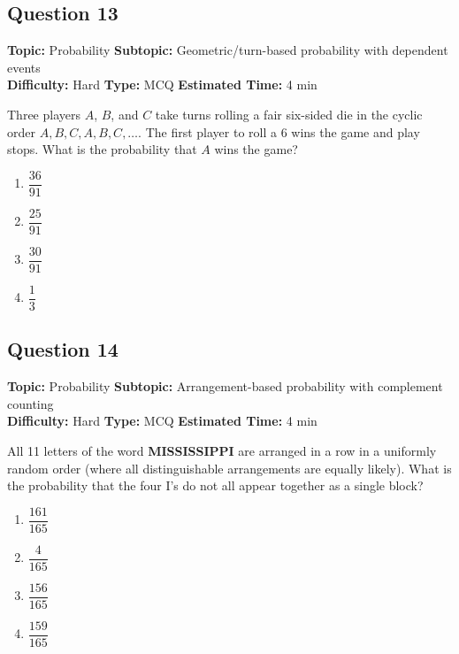 \documentclass[11pt,a4paper]{article}
\begin{document}
\subsection*{Question 13}
\textbf{Topic:} Probability \quad
\textbf{Subtopic:} Geometric/turn-based probability with dependent events \\
\textbf{Difficulty:} Hard \quad
\textbf{Type:} MCQ \quad
\textbf{Estimated Time:} 4 min
\begin{tcolorbox}[qbox]
Three players \(A\), \(B\), and \(C\) take turns rolling a fair six-sided die in the cyclic order \(A, B, C, A, B, C, \ldots\). The first player to roll a 6 wins the game and play stops. What is the probability that \(A\) wins the game?
\end{tcolorbox}
\begin{enumerate}[label=(\Alph*)]
\item \(\dfrac{36}{91}\)
\item \(\dfrac{25}{91}\)
\item \(\dfrac{30}{91}\)
\item \(\dfrac{1}{3}\)
\end{enumerate}

\subsection*{Question 14}
\textbf{Topic:} Probability \quad
\textbf{Subtopic:} Arrangement-based probability with complement counting \\
\textbf{Difficulty:} Hard \quad
\textbf{Type:} MCQ \quad
\textbf{Estimated Time:} 4 min
\begin{tcolorbox}[qbox]
All 11 letters of the word \textbf{MISSISSIPPI} are arranged in a row in a uniformly random order (where all distinguishable arrangements are equally likely). What is the probability that the four I's do not all appear together as a single block?
\end{tcolorbox}
\begin{enumerate}[label=(\Alph*)]
\item \(\dfrac{161}{165}\)
\item \(\dfrac{4}{165}\)
\item \(\dfrac{156}{165}\)
\item \(\dfrac{159}{165}\)
\end{enumerate}

\end{document}
